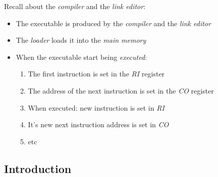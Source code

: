 \documentclass{beamer}[10pt, usepdftitle=false, handout]
\begin{document}
    \begin{frame}[label=(first)]
	
	Recall about the \textit{compiler} and the \textit{link editor}:
	
	\vspace*{1em}	
	
	\begin{itemize}
	\item{The executable is produced by the \textit{compiler} and the \textit{link editor}}
	\item{The \textit{loader} loads it into the \textit{main memory}}
	\item{When the executable start being \textit{executed}:
		\vspace*{0.5em}
		\begin{enumerate}
			\item{The first instruction is set in the \textit{RI} register}
			\item{The address of the next instruction is set in the \textit{CO} register}
			\item{When executed: new instruction is set in \textit{RI}}
			\item{It's new next instruction address is set in \textit{CO}}
			\item{etc}
		\end{enumerate}			
	
	}	
	\end{itemize}		
	
	
    \end{frame}
    
	\subsection{Introduction}    
    
\end{document}
